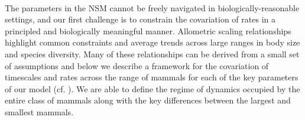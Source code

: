 \documentclass{pnastwo}
\begin{document}
\begin{article}
%



\vspace{2mm}
 \\ \nonumber
The parameters in the NSM cannot be freely navigated in biologically-reasonable settings, and our first challenge is to constrain the covariation of rates in a principled and biologically meaningful manner. %
Allometric scaling relationships highlight common constraints and average trends across large ranges in body size and species diversity. Many of these relationships can be derived from a small set of assumptions and below we describe a framework for the covariation of timescales and rates across the range of mammals for each of the key parameters of our model (cf. \cite{Yodzis:1992hg}). We are able to define the regime of dynamics occupied by the entire class of mammals along with the key differences between the largest and smallest mammals.




\end{article}
\end{document}
